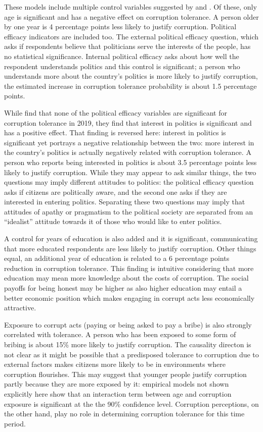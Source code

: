 \documentclass[12pt,a4]{article}\usepackage[]{graphicx}\usepackage[]{xcolor}
\begin{document}
These models include multiple control variables suggested by \textcite{Moscoso.2020} and \textcite{Lupu.2017}. Of these, only age is significant and has a negative effect on corruption tolerance. A person older by one year is 4 percentage points less likely to justify corruption. Political efficacy indicators are included too. The external political efficacy question, which asks if respondents believe that politicians serve the interests of the people, has no statistical significance. Internal political efficacy asks about how well the respondent understands politics and this control is significant; a person who understands more about the country's politics is more likely to justify corruption, the estimated increase in corruption tolerance probability is about 1.5 percentage points.

While \textcite{Moscoso.2020} find that none of the political efficacy variables are significant for corruption tolerance in 2019, they find that interest in politics is significant and has a positive effect. That finding is reversed here: interest in politics is significant yet portrays a negative relationship between the two: more interest in the country's politics is actually negatively related with corruption tolerance. A person who reports being interested in politics is about 3.5 percentage points less likely to justify corruption. While they may appear to ask similar things, the two questions may imply different attitudes to politics: the political efficacy question asks if citizens are politically aware, and the second one asks if they are interested in entering politics. Separating these two questions may imply that attitudes of apathy or pragmatism to the political society are separated from an \enquote{idealist} attitude towards it of those who would like to enter politics.

A control for years of education is also added and it is significant, communicating that more educated respondents are less likely to justify corruption. Other things equal, an additional year of education is related to a 6 percentage points reduction in corruption tolerance. This finding is intuitive considering that more education may mean more knowledge about the costs of corruption. The social payoffs for being honest may be higher as also higher education may entail a better economic position which makes engaging in corrupt acts less economically attractive. 

Exposure to corrupt acts (paying or being asked to pay a bribe) is also strongly correlated with tolerance. A person who has been exposed to some form of bribing is about 15\% more likely to justify corruption. The causality directon is not clear as it might be possible that a predisposed tolerance to corruption due to external factors makes citizens more likely to be in environments where corruption flourishes. This may suggest that younger people justify corruption partly because they are more exposed by it: empirical models not shown explicitly here show that an interaction term between age and corruption exposure is significant at the the 90\% confidence level. Corruption perceptions, on the other hand, play no role in determining corruption tolerance for this time period. 
\end{document}

